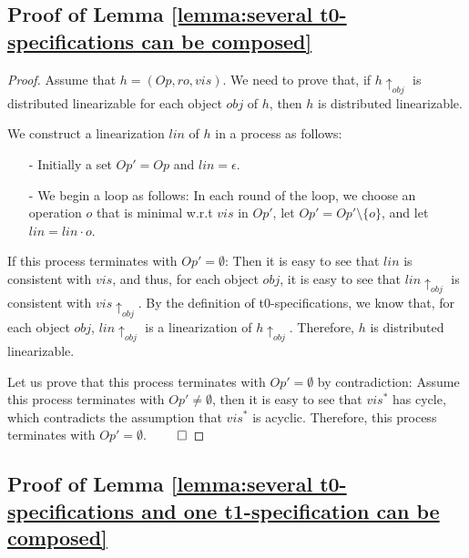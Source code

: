 {\subsection{Proof of Lemma \ref{lemma:several t0-specifications can be composed}}
\label{subsec:appendix proofs of lemma several t0-specifications can be composed}

\composingTZero*
\begin {proof}
Assume that $h = (\mathit{Op},\mathit{ro},\mathit{vis})$. We need to prove that, if $h \uparrow_{\mathit{obj}}$ is distributed linearizable for each object $\mathit{obj}$ of $h$, then $h$ is distributed linearizable.

We construct a linearization $\mathit{lin}$ of $h$ in a process as follows:

\begin{itemize}
\setlength{\itemsep}{0.5pt}
\item[-] Initially a set $\mathit{Op}' = \mathit{Op}$ and $\mathit{lin} = \epsilon$.

\item[-] We begin a loop as follows: In each round of the loop, we choose an operation $o$ that is minimal w.r.t $\mathit{vis}$ in $\mathit{Op}'$, let $\mathit{Op}' = \mathit{Op}' \setminus \{ o \}$, and let $\mathit{lin} = \mathit{lin} \cdot o$.
\end{itemize}

If this process terminates with $\mathit{Op}' = \emptyset$: Then it is easy to see that $\mathit{lin}$ is consistent with $\mathit{vis}$, and thus, for each object $\mathit{obj}$, it is easy to see that $\mathit{lin} \uparrow_{\mathit{obj}}$ is consistent with $\mathit{vis} \uparrow_{\mathit{obj}}$. By the definition of t0-specifications, we know that, for each object $\mathit{obj}$, $\mathit{lin} \uparrow_{\mathit{obj}}$ is a linearization of $h \uparrow_{\mathit{obj}}$. Therefore, $h$ is distributed linearizable.

Let us prove that this process terminates with $\mathit{Op}' = \emptyset$ by contradiction: Assume this process terminates with $\mathit{Op}' \neq \emptyset$, then it is easy to see that $\mathit{vis}^*$ has cycle, which contradicts the assumption that $\mathit{vis}^*$ is acyclic. Therefore, this process terminates with $\mathit{Op}' = \emptyset$. $\qed$
\end {proof}





\subsection{Proof of Lemma \ref{lemma:several t0-specifications and one t1-specification can be composed}}
\label{subsec:appendix proofs of lemma several t0-specifications and one t1-specification can be composed}


}
